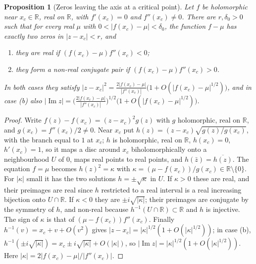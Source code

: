 \documentclass[11pt]{amsart}
\newtheorem{proposition}[theorem]{Proposition}
\theoremstyle{definition}
\theoremstyle{remark}
\renewcommand{\Im}{\operatorname{Im}}
\begin{document}
\begin{proposition}[Zeros leaving the axis at a critical point]\label{prop:geom}
Let $f$ be holomorphic near $x_c\in\mathbb R$, real on $\mathbb R$, with $f'(x_c)=0$ and
$f''(x_c)\ne0$. There are $r,\delta_0>0$ such that for every real $\mu$ with
$0<|f(x_c)-\mu|<\delta_0$, the function $f-\mu$ has exactly two zeros in $|z-x_c|<r$, and
\begin{enumerate}
\item[\rm(a)] they are real if $(f(x_c)-\mu)f''(x_c)<0$;
\item[\rm(b)] they form a non-real conjugate pair if $(f(x_c)-\mu)f''(x_c)>0$.
\end{enumerate}
In both cases they satisfy
$|z-x_c|^2=\frac{2|f(x_c)-\mu|}{|f''(x_c)|}\big(1+O(|f(x_c)-\mu|^{1/2})\big)$, and in case
{\rm(b)} also
$|\Im z|=\big(\frac{2|f(x_c)-\mu|}{|f''(x_c)|}\big)^{1/2}\big(1+O(|f(x_c)-\mu|^{1/2})\big)$.
\end{proposition}
\begin{proof}
Write $f(z)-f(x_c)=(z-x_c)^2g(z)$ with $g$ holomorphic, real on $\mathbb R$, and
$g(x_c)=f''(x_c)/2\ne0$. Near $x_c$ put $h(z)=(z-x_c)\sqrt{g(z)/g(x_c)}$, with the branch equal
to $1$ at $x_c$; $h$ is holomorphic, real on $\mathbb R$, $h(x_c)=0$, $h'(x_c)=1$, so it maps a
disc around $x_c$ biholomorphically onto a neighbourhood $U$ of $0$, maps real points to real
points, and $h(\bar z)=\overline{h(z)}$. The equation $f=\mu$ becomes $h(z)^2=\kappa$ with
$\kappa=(\mu-f(x_c))/g(x_c)\in\mathbb R\setminus\{0\}$. For $|\kappa|$ small it has the two
solutions $h=\pm\sqrt\kappa$ in $U$. If $\kappa>0$ these are real, and their preimages are real
since $h$ restricted to a real interval is a real increasing bijection onto $U\cap\mathbb R$.
If $\kappa<0$ they are $\pm i\sqrt{|\kappa|}$; their preimages are conjugate by the symmetry of
$h$, and non-real because $h^{-1}(U\cap\mathbb R)\subset\mathbb R$ and $h$ is injective.
The sign of $\kappa$ is that of $(\mu-f(x_c))f''(x_c)$. Finally $h^{-1}(v)=x_c+v+O(v^2)$
gives $|z-x_c|=|\kappa|^{1/2}(1+O(|\kappa|^{1/2}))$; in case (b),
$h^{-1}(\pm i\sqrt{|\kappa|})=x_c\pm i\sqrt{|\kappa|}+O(|\kappa|)$, so
$|\Im z|=|\kappa|^{1/2}(1+O(|\kappa|^{1/2}))$. Here $|\kappa|=2|f(x_c)-\mu|/|f''(x_c)|$.
\end{proof}
\end{document}
